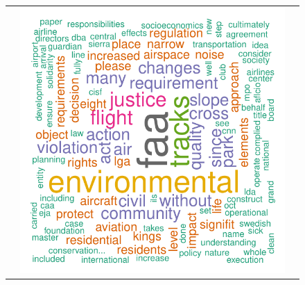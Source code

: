 \documentclass[10pt]{beamer}
\begin{document}
\begin{frame}
\begin{figure}
\begin{tabular}{ccc}
&\includegraphics[width = \textwidth/3]{ej_black_words.pdf}
\end{tabular}
\end{figure}
\end{frame}
\end{document}
